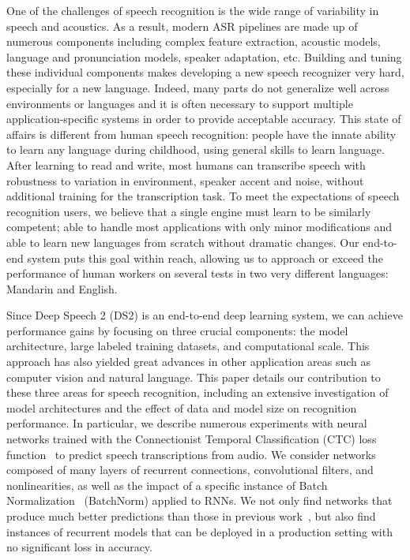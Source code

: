 \documentclass{article}
\begin{document}
One of the challenges of speech recognition is the wide range of variability in speech and acoustics. As a result, modern ASR pipelines are made up of numerous components including complex feature extraction, acoustic models, language and pronunciation models, speaker adaptation, etc. Building and tuning these individual components makes developing a new speech recognizer very hard, especially for a new language.  Indeed, many parts do not generalize well across environments or languages and it is often necessary to support multiple application-specific systems in order to provide acceptable accuracy. This state of affairs is different from human speech recognition: people have the innate ability to learn any language during childhood, using general skills to learn language. After learning to read and write, most humans can transcribe speech with robustness to variation in environment, speaker accent and noise, without additional training for the transcription task.  To meet the expectations of speech recognition users, we believe that a single engine must learn to be similarly competent; able to handle most applications with only minor modifications and able to learn new languages from scratch without dramatic changes.
Our end-to-end system puts this goal within reach, allowing us to approach or exceed the performance of human workers on several tests in two very different languages: Mandarin and English.

Since {Deep Speech 2} (DS2) is an end-to-end deep learning system, we can achieve performance gains by focusing on three crucial components:  the model architecture, large labeled training datasets, and computational scale. This approach has also yielded great advances in other application areas such as computer vision and natural language.  This paper details our contribution to these three areas for speech recognition, including an extensive investigation of model architectures and the effect of data and model size on recognition performance.  In particular, we describe numerous experiments with neural networks trained with the Connectionist Temporal Classification (CTC) loss function~\cite{graves2006} to predict speech transcriptions from audio.  We consider networks composed of many layers of recurrent connections, convolutional filters, and nonlinearities, as well as the impact of a specific instance of Batch Normalization~\cite{ioffe2015} (BatchNorm) applied to RNNs.  We not only find networks that produce much better predictions than those in previous work~\cite{hannun2014deepspeech}, but also find instances of recurrent models that can be deployed in a production setting with no significant loss in accuracy.
\end{document}
